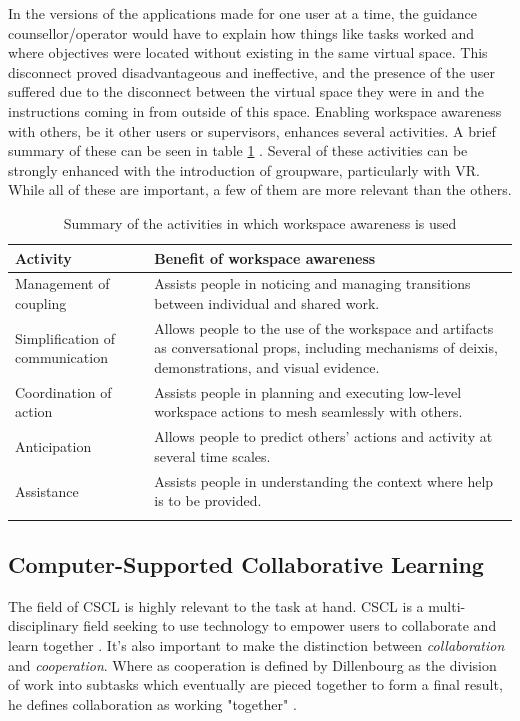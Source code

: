 In the versions of the applications made for one user at a time, the guidance counsellor/operator would have to explain how things like tasks worked and where objectives were located without existing in the same virtual space. This disconnect proved disadvantageous and ineffective, and the presence of the user suffered due to the disconnect between the virtual space they were in and the instructions coming in from outside of this space. Enabling workspace awareness with others, be it other users or supervisors, enhances several activities. A brief summary of these can be seen in table \ref{table:awarenessActivity} \cite{gutwin2002descriptive}. Several of these activities can be strongly enhanced with the introduction of groupware, particularly with VR. While all of these are important, a few of them are more relevant than the others.

\begin{table}[!h]
      \centering
        \caption{Summary of the activities in which workspace awareness is used}
        \begin{tabularx}{\textwidth}{l X}
        \toprule
        Activity & Benefit of workspace awareness \\
        \midrule
        Management of coupling & Assists people in noticing and managing transitions between individual and shared work.\\
        \vspace{0.2cm}
        Simplification of communication & Allows people to the use of the workspace and artifacts as conversational props, including mechanisms of deixis, demonstrations, and visual evidence.\\\vspace{0.2cm}
        Coordination of action & Assists people in planning and executing low-level workspace actions to mesh seamlessly with others.\\\vspace{0.2cm}
        Anticipation & Allows people to predict others’ actions and activity at several time scales.\\\vspace{0.2cm}
        Assistance & Assists people in understanding the context where help is to be provided.\\
        \bottomrule
        \label{table:awarenessActivity}
        \end{tabularx}
\end{table}



\subsection{Computer-Supported Collaborative Learning} \label{CSCL}
\label{section:CSCL}
The field of CSCL is highly relevant to the task at hand. CSCL is a multi-disciplinary field seeking to use technology to empower users to collaborate and learn together \cite{stahl2006computer}.  It's also important to make the distinction between \textit{collaboration} and \textit{cooperation}. Where as cooperation is defined by Dillenbourg as the division of work into subtasks which eventually are pieced together to form a final result, he defines collaboration as working "together" \cite{dillenbourg1999you}.

